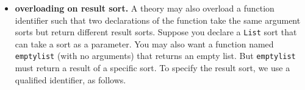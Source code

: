 \documentclass[12pt,oneside]{report}
\begin{document}
\begin{itemize}
\begin{itemize}
As the last line of the example above demonstrates, there is no implicit conversion between {\tt Int} values and {\tt Real} values, nor between any other combination of sorts. The only connections between {\tt Int} and {\tt Real} values is through explicit conversion 
functions such as {\tt to\_int} and {\tt to\_real} in the {\tt Reals\_Ints} theory.\footnote{The AUFLIRA and AUFNIRA logics currently state
that ints are implicitly converted to reals in some circumstances, but the discussion on the mailing lists concluded this should not be allowed.} %

\item {\bf overloading on result sort.} A theory may also overload a function identifier such that two declarations of the function take
the same argument sorts but return different result sorts.  Suppose you declare a {\tt List} sort that can take a sort as a parameter.
You may also want a function named {\tt emptylist} (with no arguments) that returns an empty list. But {\tt emptylist} must return a 
result of a specific sort. To specify the result sort, we use a qualified identifier, as follows.


\end{itemize}
\end{itemize}
\end{document}
